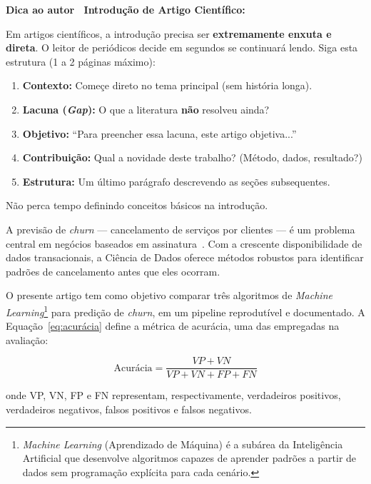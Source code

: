 \documentclass[
    article,
    12pt,
    oneside,
    a4paper,
    english,
    brazilian
    ]{abntex2}
\numberwithin{equation}{section}
\newenvironment{dica}{%
    \par\medskip
    \color{blue!60!black}\small\itshape
}{%
    \par\medskip
}
\begin{document}
\begin{dica}
\noindent\textbf{Dica ao autor \textemdash\ Introdução de Artigo Científico:}

Em artigos científicos, a introdução precisa ser \textbf{extremamente enxuta e direta}. O leitor de periódicos decide em segundos se continuará lendo. Siga esta estrutura (1 a 2 páginas máximo):
\begin{enumerate}
    \item \textbf{Contexto:} Começe direto no tema principal (sem história longa).
    \item \textbf{Lacuna (\textit{Gap}):} O que a literatura \textbf{não} resolveu ainda?
    \item \textbf{Objetivo:} ``Para preencher essa lacuna, este artigo objetiva...''
    \item \textbf{Contribuição:} Qual a novidade deste trabalho? (Método, dados, resultado?)
    \item \textbf{Estrutura:} Um último parágrafo descrevendo as seções subsequentes.
\end{enumerate}
Não perca tempo definindo conceitos básicos na introdução.
\end{dica}

A previsão de \textit{churn} --- cancelamento de serviços por clientes --- é um problema central em negócios baseados em assinatura~\cite{geron2022}. Com a crescente disponibilidade de dados transacionais, a Ciência de Dados oferece métodos robustos para identificar padrões de cancelamento antes que eles ocorram.

O presente artigo tem como objetivo comparar três algoritmos de \textit{Machine Learning}\footnote{\textit{Machine Learning} (Aprendizado de Máquina) é a subárea da Inteligência Artificial que desenvolve algoritmos capazes de aprender padrões a partir de dados sem programação explícita para cada cenário.} para predição de \textit{churn}, em um pipeline reprodutível e documentado. A Equação~\ref{eq:acurácia} define a métrica de acurácia, uma das empregadas na avaliação:

\begin{equation}
    \text{Acurácia} = \frac{VP + VN}{VP + VN + FP + FN}
    \label{eq:acurácia}
\end{equation}

\noindent onde VP, VN, FP e FN representam, respectivamente, verdadeiros positivos, verdadeiros negativos, falsos positivos e falsos negativos.
\end{document}
